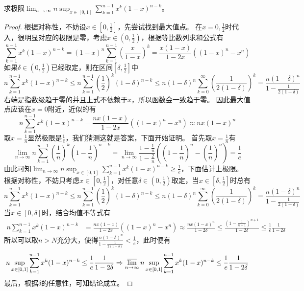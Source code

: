 \documentclass[lang=cn,newtx,10pt,scheme=chinese]{elegantbook}
\begin{document}
\begin{example}
求极限\(\lim_{n\rightarrow\infty}n\sup_{x\in[0,1]}\sum_{k = 1}^{n - 1}x^{k}(1 - x)^{n - k}\)。
\end{example}
\begin{proof}
根据对称性，不妨设\(x\in\left[0,\frac{1}{2}\right]\)，先尝试找到最大值点。
在\(x = 0,\frac{1}{2}\)时代入，很明显对应的极限是零，考虑\(x\in\left(0,\frac{1}{2}\right)\)，根据等比数列求和公式有
\[
\sum_{k = 1}^{n - 1}x^{k}(1 - x)^{n - k}=(1 - x)^{n}\sum_{k = 1}^{n - 1}\left(\frac{x}{1 - x}\right)^{k}=\frac{x(1 - x)}{1 - 2x}((1 - x)^{n}-x^{n})
\]
如果\(\delta\in\left(0,\frac{1}{2}\right)\)已经取定，则在区间\(\left[\delta,\frac{1}{2}\right]\)中
\[
n\sum_{k = 1}^{n - 1}x^{k}(1 - x)^{n - k}\leq n\sum_{k = 1}^{n - 1}\left(\frac{1}{2}\right)^{k}(1 - \delta)^{n - k}\leq n(1 - \delta)^{n}\sum_{k = 0}^{\infty}\left(\frac{1}{2(1 - \delta)}\right)^{k}=\frac{n(1 - \delta)^{n}}{1-\frac{1}{2(1 - \delta)}}
\]
右端是指数级趋于零的并且上式不依赖于\(x\)，所以函数会一致趋于零。
因此最大值点应该在\(x = 0\)附近，近似的有
\[
n\sum_{k = 1}^{n - 1}x^{k}(1 - x)^{n - k}=\frac{nx(1 - x)}{1 - 2x}((1 - x)^{n}-x^{n})\approx nx(1 - x)^{n}
\]
取\(x = \frac{1}{n}\)显然极限是\(\frac{1}{e}\)，我们猜测这就是答案，下面开始证明。
首先取\(x = \frac{1}{n}\)有
\[
\lim_{n\rightarrow\infty}n\sum_{k = 1}^{n - 1}\left(\frac{1}{n}\right)^{k}\left(1-\frac{1}{n}\right)^{n - k}=\lim_{n\rightarrow\infty}\frac{1-\frac{1}{n}}{1-\frac{2}{n}}\left(\left(1-\frac{1}{n}\right)^{n}-\left(\frac{1}{n}\right)^{n}\right)=\frac{1}{e}
\]
由此可知\(\lim_{n\rightarrow\infty}n\sup_{x\in[0,1]}\sum_{k = 1}^{n - 1}x^{k}(1 - x)^{n - k}\geq\frac{1}{e}\)，下面估计上极限。
根据对称性，不妨只考虑\(x\in\left[0,\frac{1}{2}\right]\)，对任意\(\delta\in\left(0,\frac{1}{2}\right)\)取定，当\(x\in\left[\delta,\frac{1}{2}\right]\)时总有
\[
n\sum_{k = 1}^{n - 1}x^{k}(1 - x)^{n - k}\leq n\sum_{k = 1}^{n - 1}\left(\frac{1}{2}\right)^{k}(1 - \delta)^{n - k}\leq n(1 - \delta)^{n}\sum_{k = 0}^{\infty}\left(\frac{1}{2(1 - \delta)}\right)^{k}=\frac{n(1 - \delta)^{n}}{1-\frac{1}{2(1 - \delta)}}
\]
当\(x\in[0,\delta]\)时，结合均值不等式有
\begin{align*}
n\sum_{k = 1}^{n - 1}x^{k}(1 - x)^{n - k}&=\frac{nx(1 - x)}{1 - 2x}((1 - x)^{n}-x^{n})\approx\frac{nx(1 - x)^{n}}{1 - 2\delta}\leq\frac{\left(1-\frac{1}{n + 1}\right)^{n + 1}}{1 - 2\delta}\leq\frac{1}{e}\frac{1}{1 - 2\delta}
\end{align*}
所以可以取\(n > N\)充分大，使得\(\frac{n(1 - \delta)^{n}}{1-\frac{1}{2(1 - \delta)}}<\frac{1}{e}\)，此时便有
\[
n\sup_{x\in[0,1]}\sum_{k = 1}^{n - 1}x^{k}(1 - x)^{n - k}\leq\frac{1}{e}\frac{1}{1 - 2\delta}\Rightarrow\varlimsup_{n\rightarrow\infty}n\sup_{x\in[0,1]}\sum_{k = 1}^{n - 1}x^{k}(1 - x)^{n - k}\leq\frac{1}{e}\frac{1}{1 - 2\delta}
\]
最后，根据\(\delta\)的任意性，可知结论成立。
\end{proof}
\end{document}
